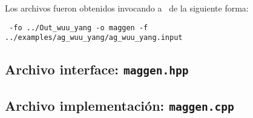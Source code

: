 Los archivos fueron obtenidos invocando a \maggen\ de la siguiente forma:

\begin{center}
\footnotesize
\texttt{\maggen\ -fo ../Out\_wuu\_yang -o maggen -f  ../examples/ag\_wuu\_yang/ag\_wuu\_yang.input}
\end{center}

\subsection*{Archivo interface: \texttt{maggen.hpp}}



\subsection*{Archivo implementación: \texttt{maggen.cpp}}



\normalsize
